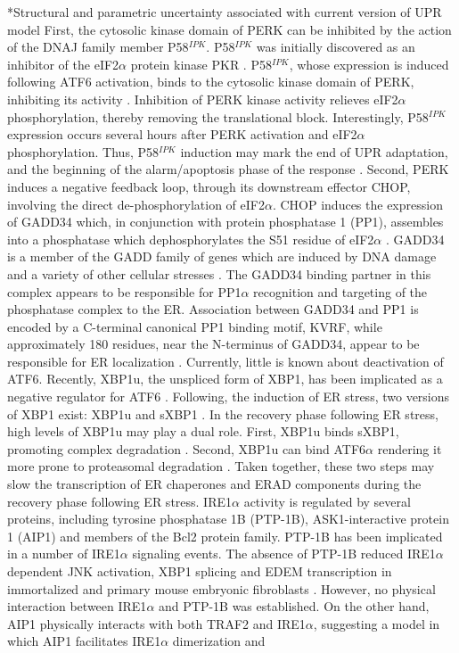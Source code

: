 \documentclass[12pt]{article}
\makeatletter
\renewcommand\section{\@startsection
	{subsection}{2}{0mm}
	{-0.2in}
	{0.05\baselineskip}
	{\normalfont\normalsize\bfseries}}
\makeatother
\begin{document}
\section*{Structural and parametric uncertainty associated with current version of UPR model}
First, the cytosolic kinase domain of PERK can be inhibited by the action of the DNAJ family member P58$^{IPK}$. P58$^{IPK}$ was initially discovered as an inhibitor of the eIF2$\alpha$ protein kinase PKR \citep{Lee:1990ye}. P58$^{IPK}$, whose expression is induced following ATF6 activation, binds to the cytosolic kinase domain of PERK, inhibiting its activity \citep{Yan:2002fk,Huizen:2003qo}. Inhibition of PERK kinase activity relieves eIF2$\alpha$ phosphorylation, thereby removing the translational block. Interestingly, P58$^{IPK}$ expression occurs several hours after PERK activation and eIF2$\alpha$ phosphorylation. Thus, P58$^{IPK}$ induction may mark the end of UPR adaptation, and the beginning of the alarm/apoptosis phase of the response \citep{szegezdi2006mediators}. Second, PERK induces a negative feedback loop, through its downstream effector CHOP, involving the direct de-phosphorylation of eIF2$\alpha$. CHOP induces the expression of GADD34 which, in conjunction with protein phosphatase 1 (PP1), assembles into a phosphatase which dephosphorylates the S51 residue of eIF2$\alpha$ \citep{Novoa:2001mb}. GADD34 is a member of the GADD family of genes which are induced by DNA damage and a variety of other cellular stresses \citep{Zhan:1994cq}. The GADD34 binding partner in this complex appears to be responsible for PP1$\alpha$ recognition and targeting of the phosphatase complex to the ER. Association between GADD34 and PP1 is encoded by a C-terminal canonical PP1 binding motif, KVRF, while approximately 180 residues, near the N-terminus of GADD34, appear to be responsible for ER localization \citep{Brush:2003kh}. Currently, little is known about deactivation of ATF6. Recently, XBP1u, the unspliced form of XBP1, has been implicated as a negative regulator for ATF6 \citep{Yoshida:2009bs}. Following, the induction of ER stress, two versions of XBP1 exist: XBP1u and sXBP1 \citep{Yoshida:2009bs}. In the recovery phase following ER stress, high levels of XBP1u may play a dual role. First, XBP1u binds sXBP1, promoting complex degradation \citep{Yoshida:2006dz, Tirosh:2006fv}. Second, XBP1u can bind ATF6$\alpha$ rendering it more prone to proteasomal degradation \citep{Yoshida:2009bs}. Taken together, these two steps may slow the transcription of ER chaperones and ERAD components during the recovery phase following ER stress. IRE1$\alpha$ activity is regulated by several proteins, including tyrosine phosphatase 1B (PTP-1B), ASK1-interactive protein 1 (AIP1) and members of the Bcl2 protein family. PTP-1B has been implicated in a number of IRE1$\alpha$ signaling events. The absence of PTP-1B reduced IRE1$\alpha$ dependent JNK activation, XBP1 splicing and EDEM transcription in immortalized and primary mouse embryonic fibroblasts \citep{Gu:2004kx}. However, no physical interaction between IRE1$\alpha$ and PTP-1B was established. On the other hand, AIP1 physically interacts with both TRAF2 and IRE1$\alpha$, suggesting a model in which AIP1 facilitates IRE1$\alpha$ dimerization and 
\end{document}
